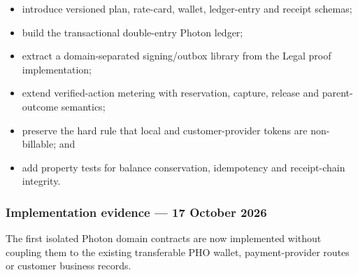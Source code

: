\documentclass[11pt]{article}
\begin{document}
\begin{itemize}
  \item introduce versioned plan, rate-card, wallet, ledger-entry and receipt schemas;
  \item build the transactional double-entry Photon ledger;
  \item extract a domain-separated signing/outbox library from the Legal proof implementation;
  \item extend verified-action metering with reservation, capture, release and parent-outcome semantics;
  \item preserve the hard rule that local and customer-provider tokens are non-billable; and
  \item add property tests for balance conservation, idempotency and receipt-chain integrity.
\end{itemize}

\subsubsection*{Implementation evidence --- 17 October 2026}

The first isolated Photon domain contracts are now implemented without coupling them to the existing transferable PHO wallet, payment-provider routes or customer business records.
\end{document}
